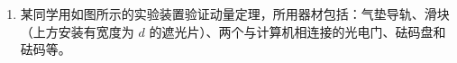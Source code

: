 \documentclass[\gkver]{gaokaozhenti}
\begin{document}
\begin{enumerate}
{根据一次函数关系可知对应斜率为 $\frac{R_{x}R_{V}}{R_{x}+R_{V}}$。

若将电压表接在 O、Q 之间，电流表分压为 $U_{A}=IR_{A}$，根据欧姆定律变形可知 $R=\frac{U-IR_{A}}{I}$，解得：

$U=I(R+R_{\mathrm{A}})$

根据一次函数可知对应斜率为 $R+R_{A}$，对比图像的斜率可知 $k_{1}>k_{II}$

所以 II 图线是采用电压表跨接在 O、P 之间。

（2）因为待测电阻为几十欧姆的电阻，通过图像斜率大致估算待测电阻为 $50\UO$ 左右，根据

$\frac{1\UkO}{50\UO}<\frac{50\UO}{0.5\UO}$

说明电流表的分压较小，电压表的分流相对较大，所以电压表应跨接在 O、Q 之间，所以选择图线 I 得到的结果较为准确。

根据图像可知

$R_{x}=\frac{3\UV-1\UV}{59.6\UmA-20\UmA}\approx50.5\UO$

（3）考虑电流表内阻，则修正后的电阻为

$R_{\mathrm{x}}^{\prime}=R_{x}-r_{\mathrm{A}}=50.5\UO-0.5\UO=50.0\UO$
}

\item
某同学用如图所示的实验装置验证动量定理，所用器材包括：气垫导轨、滑块（上方安装有宽度为 $d$ 的遮光片）、两个与计算机相连接的光电门、砝码盘和砝码等。



\end{enumerate}
\end{document}
